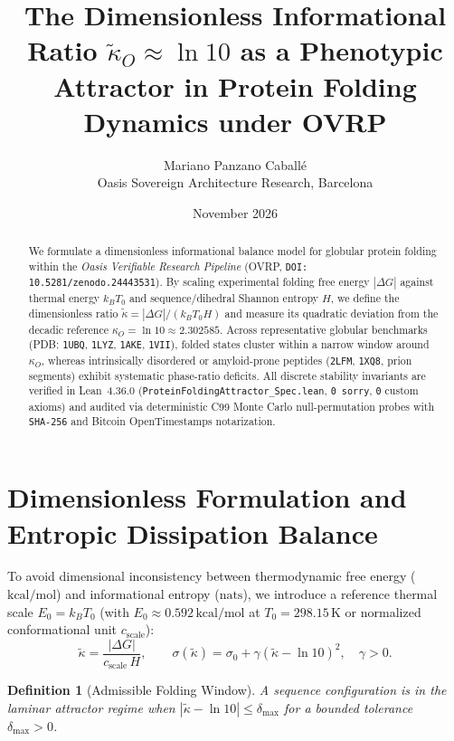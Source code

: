 \documentclass[11pt,a4paper]{article}
\title{The Dimensionless Informational Ratio $\tilde{\kappa}_O \approx \ln 10$ as a Phenotypic Attractor in Protein Folding Dynamics under OVRP}
\author{Mariano Panzano Caball\'e \\ \small Oasis Sovereign Architecture Research, Barcelona}
\date{November 2026}
\newtheorem{definition}{Definition}
\begin{document}
\maketitle

\begin{abstract}
We formulate a dimensionless informational balance model for globular protein folding within the \emph{Oasis Verifiable Research Pipeline} (OVRP, \texttt{DOI: 10.5281/zenodo.24443531}). By scaling experimental folding free energy $|\Delta G|$ against thermal energy $k_B T_0$ and sequence/dihedral Shannon entropy $H$, we define the dimensionless ratio $\tilde{\kappa} = |\Delta G| / (k_B T_0 H)$ and measure its quadratic deviation from the decadic reference $\kappa_O = \ln 10 \approx 2.302585$. Across representative globular benchmarks (PDB: \texttt{1UBQ}, \texttt{1LYZ}, \texttt{1AKE}, \texttt{1VII}), folded states cluster within a narrow window around $\kappa_O$, whereas intrinsically disordered or amyloid-prone peptides (\texttt{2LFM}, \texttt{1XQ8}, prion segments) exhibit systematic phase-ratio deficits. All discrete stability invariants are verified in Lean~4.36.0 (\texttt{ProteinFoldingAttractor\_Spec.lean}, \texttt{0 sorry}, \texttt{0} custom axioms) and audited via deterministic C99 Monte Carlo null-permutation probes with \texttt{SHA-256} and Bitcoin OpenTimestamps notarization.
\end{abstract}

\section{Dimensionless Formulation and Entropic Dissipation Balance}
To avoid dimensional inconsistency between thermodynamic free energy ($\text{kcal/mol}$) and informational entropy ($\text{nats}$), we introduce a reference thermal scale $E_0 = k_B T_0$ (with $E_0 \approx 0.592\,\text{kcal/mol}$ at $T_0 = 298.15\,\text{K}$ or normalized conformational unit $c_{\mathrm{scale}}$):
\begin{equation}
\tilde{\kappa} = \frac{|\Delta G|}{c_{\mathrm{scale}} \, H}, \qquad \sigma(\tilde{\kappa}) = \sigma_0 + \gamma \left(\tilde{\kappa} - \ln 10\right)^2, \quad \gamma > 0.
\end{equation}

\begin{definition}[Admissible Folding Window]
A sequence configuration is in the laminar attractor regime when $|\tilde{\kappa} - \ln 10| \le \delta_{\max}$ for a bounded tolerance $\delta_{\max} > 0$.
\end{definition}
\end{document}
